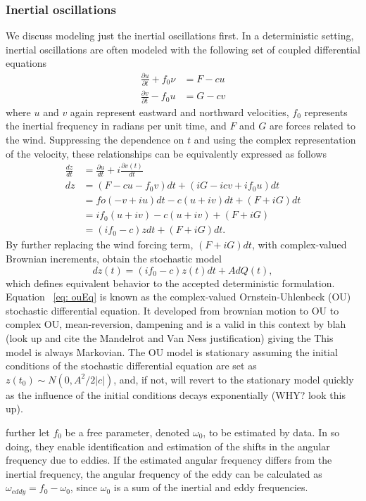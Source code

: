 \documentclass{stat572Style}
\begin{document}
\subsubsection{Inertial oscillations}
We discuss modeling just the inertial oscillations first. In a deterministic setting, inertial oscillations are often modeled with the following set of coupled differential equations \citep{Pollard1970}
\begin{align}
\frac{\partial u }{\partial t}  + f_{0} \nu &= F - cu \\ \nonumber
\frac{\partial v}{\partial t} - f_{0}u &= G - cv
\end{align}
where $u$ and $v$ again represent eastward and northward velocities, $f_{0}$ represents the inertial frequency in radians per unit time, and $F$ and $G$ are forces related to the wind. Suppressing the dependence on $t$ and using the complex representation of the velocity, these relationships can be equivalently expressed as follows
\begin{align*}
\label{eq: diffEqDeriv}
\frac{dz}{dt} &= \frac{\partial u}{dt} + i\frac{\partial v(t)}{dt}\\
dz &= (F - c u- f_{0}v)dt + (iG - icv + if_{0}u)dt\\
&= fo(-v + iu)dt - c(u + iv)dt + (F + iG)dt\\
&= if_{0}(u + iv) - c(u + iv) + (F + iG)\\
&= (if_{0} - c)z dt + (F + iG)dt. 
\end{align*}
By further replacing the wind forcing term, $(F + iG)dt$, with complex-valued Brownian increments, \citet{Sykulski2016} obtain the stochastic model 
\begin{equation}
\label{eq: ouEq}
dz(t) = (i f_{0} -c) z(t) dt + A d Q(t), 
\end{equation}
which defines equivalent behavior to the accepted deterministic formulation. Equation ~\ref{eq: ouEq}  is known as the complex-valued Ornstein-Uhlenbeck (OU) stochastic differential equation. It developed from brownian motion to OU to complex OU, mean-reversion, dampening and is a valid in this context by  blah (look up and cite the Mandelrot and Van Ness justification) giving the This model is always Markovian. The OU model is stationary assuming the initial conditions of the stochastic differential equation are set as $z(t_{0}) \sim N(0, A^{2}/2|c|)$, and, if not, will revert to the stationary model quickly as the influence of the initial conditions decays exponentially (WHY? look this up). 

\citet{Sykulski2016} further let $f_{0}$ be a free parameter, denoted $\omega_{0}$, to be estimated by data. In so doing, they enable  identification and estimation of the shifts in the angular frequency due to eddies. If the estimated angular frequency differs from the inertial frequency, the angular frequency of the eddy can be calculated as $\omega_{eddy} = f_{0} - \omega_{0}$, since $\omega_{0}$ is a sum of the inertial and eddy frequencies.
\end{document}
